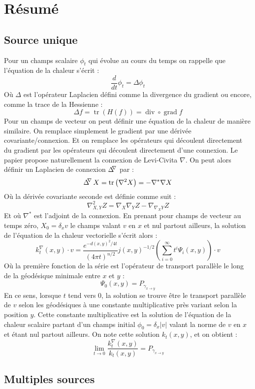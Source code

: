\documentclass[11pt]{article}
\DeclareMathOperator{\trace}{tr}
\DeclareMathOperator{\grad}{grad}
\DeclareMathOperator{\divergence}{div}
\DeclareMathOperator{\connexionLaplacian}{\Delta^{\hspace{-3pt} \nabla}}
\begin{document}
	\section{Résumé}
	
	\subsection{Source unique}
	Pour un champs scalaire $\phi_t$ qui évolue au cours du temps on rappelle que l'équation de la chaleur s'écrit :
	$$ \frac{d}{dt} \phi_t = \Delta \phi_t $$
	Où $\Delta$ est l'opérateur Laplacien défini comme la divergence du gradient ou encore, comme la trace de la Hessienne :
	$$ \Delta f = \trace \left( H(f) \right) = \divergence \circ \grad f $$
	Pour un champs de vecteur on peut définir une équation de la chaleur de manière similaire. On remplace simplement le gradient par une dérivée covariante/connexion. Et on remplace les opérateurs qui découlent directement du gradient par les opérateurs qui découlent directement d'une connexion. Le papier propose naturellement la connexion de Levi-Civita $\nabla$. On peut alors définir un Laplacien de connexion $\connexionLaplacian$ par :
	$$ \connexionLaplacian X = \trace \left( \nabla^2 X \right) = - \nabla^* \nabla X $$
	Où la dérivée covariante seconde est définie comme suit :
	$$ \nabla^2_{X, Y} Z = \nabla_X \nabla_Y Z - \nabla_{\nabla_X Y} Z $$
	Et où $\nabla^*$ est l'adjoint de la connexion.
	En prenant pour champs de vecteur au temps zéro, $X_0 = \delta_x v$ le champs valant $v$ en $x$ et nul partout ailleurs, la solution de l'équation de la chaleur vectorielle s'écrit alors :
	$$ k_t^\nabla(x, y) \cdot v = \frac{e^{-d(x, y)^2 / 4t}}{(4 \pi t)^{n/2}} j(x, y)^{-1/2} \left( \sum_{i=0}^\infty t^i \Psi_i(x, y) \right) \cdot v $$
	Où la première fonction de la série est l'opérateur de transport parallèle le long de la géodésique minimale entre $x$ et $y$ :
	$$ \Psi_0(x, y) = P_{\gamma_{x \rightarrow y}} $$
	En ce sens, lorsque $t$ tend vers 0, la solution se trouve être le transport parallèle de $v$ selon les géodésiques à une constante multiplicative près variant selon la position $y$. Cette constante multiplicative est la solution de l'équation de la chaleur scalaire partant d'un champs initial $\phi_0 = \delta_x |v|$ valant la norme de $v$ en $x$ et étant nul partout ailleurs. On note cette solution $k_t(x, y)$, et on obtient :
	$$ \lim_{t \rightarrow 0} \frac{k_t^\nabla(x, y)}{k_t(x, y)} = P_{\gamma_{x \rightarrow y}} $$
	
	\subsection{Multiples sources}
	
\end{document}
